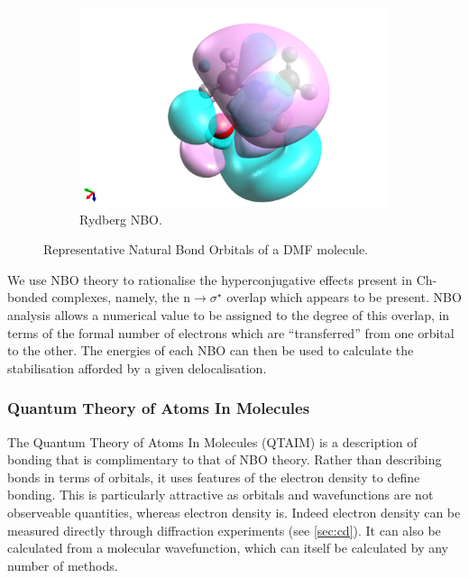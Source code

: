 \begin{refsection}
\begin{figure}
    \begin{subfigure}{0.3\linewidth}
        \includegraphics[width=\linewidth]{Figures/dmfnbo-rydberg.png}
        \caption{Rydberg NBO.}
    \end{subfigure}
    \caption{Representative Natural Bond Orbitals of a DMF molecule.}
    \label{fig:nbos}
\end{figure}

We use NBO theory to rationalise the hyperconjugative effects present in Ch-bonded complexes, namely, the $\text{n}\rightarrow\sigma^{\star}$ overlap which appears to be present.
NBO analysis allows a numerical value to be assigned to the degree of this overlap, in terms of the formal number of electrons which are ``transferred'' from one orbital to the other.
The energies of each NBO can then be used to calculate the stabilisation afforded by a given delocalisation.


\subsubsection{Quantum Theory of Atoms In Molecules}
The Quantum Theory of Atoms In Molecules (QTAIM) is a description of bonding that is complimentary to that of NBO theory.\autocite{Bader1991}
Rather than describing bonds in terms of orbitals, it uses features of the electron density to define bonding.
This is particularly attractive as orbitals and wavefunctions are not observeable quantities, whereas electron density is.
Indeed electron density can be measured directly through diffraction experiments (see \cref{sec:cd}).
It can also be calculated from a molecular wavefunction, which can itself be calculated by any number of methods.


\end{refsection}
